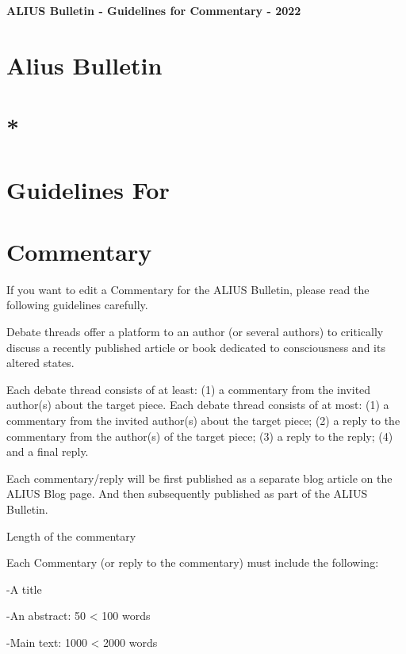 \documentclass[11pt]{article}
\begin{document}
{\LARGE\bfseries ALIUS Bulletin - Guidelines for Commentary - 2022\par}
\vspace{1em}
\section*{Alius Bulletin}
\section*{*}
\section*{Guidelines For}
\section*{Commentary}
If you want to edit a Commentary for the ALIUS Bulletin, please read the following guidelines carefully.\par

Debate threads offer a platform to an author (or several authors) to critically discuss a recently published article or book dedicated to consciousness and its altered states.\par

Each debate thread consists of at least: (1) a commentary from the invited author(s) about the target piece. Each debate thread consists of at most: (1) a commentary from the invited author(s) about the target piece; (2) a reply to the commentary from the author(s) of the target piece; (3) a reply to the reply; (4) and a final reply.\par

Each commentary/reply will be first published as a separate blog article on the ALIUS Blog page. And then subsequently published as part of the ALIUS Bulletin.\par

Length of the commentary\par

Each Commentary (or reply to the commentary) must include the following:\par

-A title\par

-An abstract: 50 < 100 words\par

-Main text: 1000 < 2000 words\par
\end{document}

